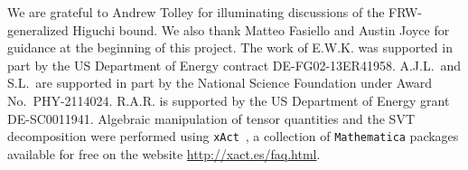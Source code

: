 \documentclass[11pt,a4paper]{article}
\begin{document}
\begin{acknowledgments}
We are grateful to Andrew Tolley for illuminating discussions of the FRW-generalized Higuchi bound.  We also thank Matteo Fasiello and Austin Joyce for guidance at the beginning of this project.  The work of E.W.K. was supported in part by the US Department of Energy contract DE-FG02-13ER41958.  A.J.L.~and S.L.~are supported in part by the National Science Foundation under Award No.~PHY-2114024.  R.A.R. is supported by the US Department of Energy grant DE-SC0011941.  Algebraic manipulation of tensor quantities and the SVT decomposition were performed using \texttt{xAct}~\cite{Brizuela:2008ra}, a collection of \texttt{Mathematica} packages available for free on the website \url{http://xact.es/faq.html}.
\end{acknowledgments}
\end{document}
